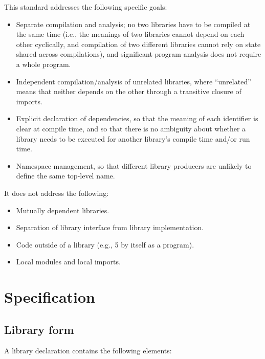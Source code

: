 \documentclass{monograph}
\begin{document}
This standard addresses the following specific goals:

\begin{itemize}
\item Separate compilation and analysis; no two libraries have to be compiled at the same time (i.e., the meanings of two libraries cannot depend on each other cyclically, and compilation of two different libraries cannot rely on state shared across compilations), and significant program analysis does not require a whole program.
\item Independent compilation/analysis of unrelated libraries, where ``unrelated'' means that neither depends on the other through a transitive closure of imports.
\item Explicit declaration of dependencies, so that the meaning of each identifier is clear at compile time, and so that there is no ambiguity about whether a library needs to be executed for another library's compile time and/or run time.
\item Namespace management, so that different library producers are unlikely to define the same top-level name. 
\end{itemize}

It does not address the following:

\begin{itemize}
\item Mutually dependent libraries.
\item Separation of library interface from library implementation.
\item Code outside of a library (e.g., 5 by itself as a program).
\item Local modules and local imports. 
\end{itemize}


\section{Specification\label{sec:specification}}

\subsection{Library form}

A library declaration contains the following elements:
\end{document}
